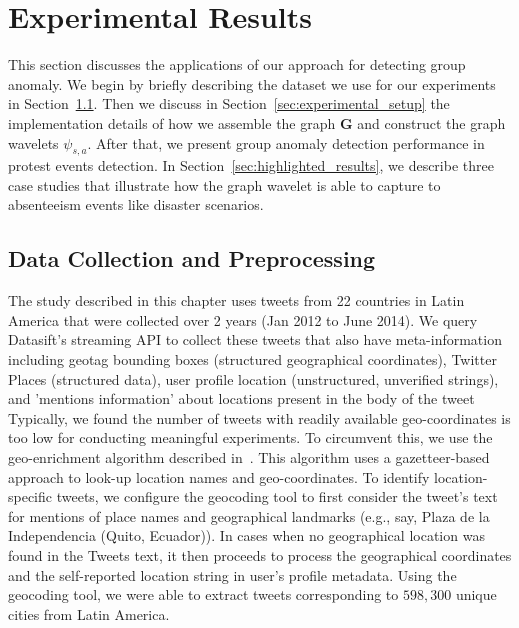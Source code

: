 \section{Experimental Results}
\label{sec:experiment}
This section discusses the applications of our approach for detecting group anomaly.
We begin by briefly describing the dataset we use for our experiments in Section~\ref{sec:data_collection}.
Then we discuss in Section~\ref{sec:experimental_setup} the implementation details of how we assemble the graph $\mathbf{G}$ and construct the graph wavelets $\psi_{s,a}$.
After that, we present group anomaly detection performance in protest events detection. In Section~\ref{sec:highlighted_results}, we describe three case studies that illustrate how the graph wavelet is able to capture to absenteeism events like disaster scenarios.


\subsection{Data Collection and Preprocessing}
\label{sec:data_collection}
The study described in this chapter uses tweets from 22 countries in Latin America that were collected over 2 years (Jan 2012 to June 2014).
We query Datasift's streaming API to collect these tweets that also have meta-information including geotag bounding boxes (structured geographical coordinates), Twitter Places (structured data), user profile location (unstructured, unverified strings), and 'mentions information' about locations present in the body of the tweet
Typically, we found the number of tweets with readily available geo-coordinates is too low for conducting meaningful experiments.
To circumvent this, we use the geo-enrichment algorithm described in~\cite{ramakrishnan2014beating}.
This algorithm uses a gazetteer-based approach to look-up location names and geo-coordinates.
To identify  location-specific tweets, we configure the geocoding tool to first consider the tweet's text for mentions of place names and geographical landmarks (e.g., say, Plaza de la Independencia (Quito, Ecuador)).
In cases when no geographical location was found in the Tweets text, it then proceeds to process the geographical coordinates and the self-reported location string in user's profile metadata.
Using the geocoding tool, we were able to extract tweets corresponding to $598,300$ unique cities from Latin America.





